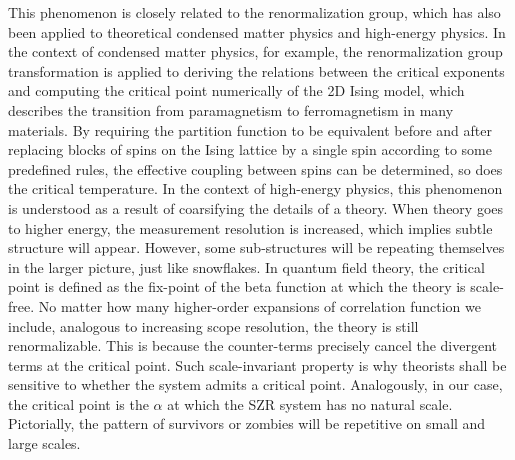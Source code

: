\documentclass[11pt]{article}
\begin{document}
This phenomenon is closely related to the renormalization group, which has also been applied to theoretical condensed matter physics and high-energy physics. In the context of condensed matter physics, for example, the renormalization group transformation is applied to deriving the relations between the critical exponents and computing the critical point numerically of the 2D Ising model, which describes the transition from paramagnetism to ferromagnetism in many materials. By requiring the partition function to be equivalent before and after replacing blocks of spins on the Ising lattice by a single spin according to some predefined rules, the effective coupling between spins can be determined, so does the critical temperature. In the context of high-energy physics, this phenomenon is understood as a result of coarsifying the details of a theory. When theory goes to higher energy, the measurement resolution is increased, which implies subtle structure will appear. However, some sub-structures will be repeating themselves in the larger picture, just like snowflakes. In quantum field theory, the critical point is defined as the fix-point of the beta function at which the theory is scale-free. No matter how many higher-order expansions of correlation function we include, analogous to increasing scope resolution, the theory is still renormalizable. This is because the counter-terms precisely cancel the divergent terms at the critical point. Such scale-invariant property is why theorists shall be sensitive to whether the system admits a critical point. Analogously, in our case, the critical point is the $\alpha$ at which the SZR system has no natural scale. Pictorially, the pattern of survivors or zombies will be repetitive on small and large scales.

\end{document}
